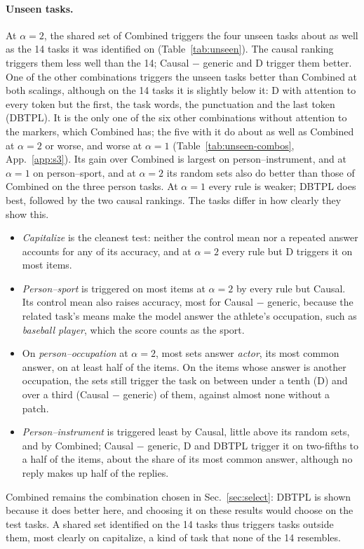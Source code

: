 \documentclass[10pt,a4paper]{article}
\begin{document}
\paragraph{Unseen tasks.} At $\alpha=2$, the shared set of Combined triggers the four unseen tasks about as well as the 14 tasks it was identified on (Table~\ref{tab:unseen}). The causal ranking triggers them less well than the 14; Causal $-$ generic and D trigger them better. One of the other combinations triggers the unseen tasks better than Combined at both scalings, although on the 14 tasks it is slightly below it: D with attention to every token but the first, the task words, the punctuation and the last token (DBTPL). It is the only one of the six other combinations without attention to the markers, which Combined has; the five with it do about as well as Combined at $\alpha=2$ or worse, and worse at $\alpha=1$ (Table~\ref{tab:unseen-combos}, App.~\ref{app:s3}). Its gain over Combined is largest on person--instrument, and at $\alpha=1$ on person--sport, and at $\alpha=2$ its random sets also do better than those of Combined on the three person tasks. At $\alpha=1$ every rule is weaker; DBTPL does best, followed by the two causal rankings. The tasks differ in how clearly they show this.
\begin{itemize}
\item \emph{Capitalize} is the cleanest test: neither the control mean nor a repeated answer accounts for any of its accuracy, and at $\alpha=2$ every rule but D triggers it on most items.
\item \emph{Person--sport} is triggered on most items at $\alpha=2$ by every rule but Causal. Its control mean also raises accuracy, most for Causal $-$ generic, because the related task's means make the model answer the athlete's occupation, such as \emph{baseball player}, which the score counts as the sport.
\item On \emph{person--occupation} at $\alpha=2$, most sets answer \emph{actor}, its most common answer, on at least half of the items. On the items whose answer is another occupation, the sets still trigger the task on between under a tenth (D) and over a third (Causal $-$ generic) of them, against almost none without a patch.
\item \emph{Person--instrument} is triggered least by Causal, little above its random sets, and by Combined; Causal $-$ generic, D and DBTPL trigger it on two-fifths to a half of the items, about the share of its most common answer, although no reply makes up half of the replies.
\end{itemize}
Combined remains the combination chosen in Sec.~\ref{sec:select}: DBTPL is shown because it does better here, and choosing it on these results would choose on the test tasks. A shared set identified on the 14 tasks thus triggers tasks outside them, most clearly on capitalize, a kind of task that none of the 14 resembles.
\end{document}
